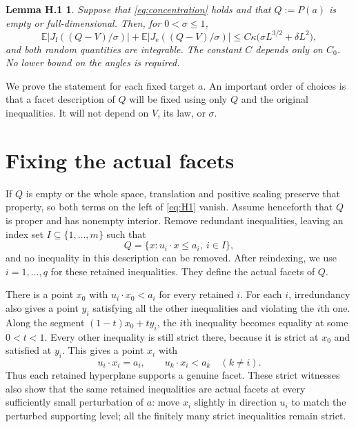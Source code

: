 \documentclass[11pt]{article}
\newcommand{\E}{\mathbb E}
\newcommand{\Jf}{J_{\mathrm f}}
\newcommand{\Je}{J_{\mathrm e}}
\newtheorem*{Hone}{Lemma H.1}
\begin{document}
\begin{Hone}
Suppose that \eqref{eq:concentration} holds and that $Q:=P(a)$ is empty
or full-dimensional. Then, for $0<\sigma\le1$,
\begin{equation}\label{eq:H1}
 \E\bigl|\Jf((Q-V)/\sigma)\bigr|
 +\E\bigl|\Je((Q-V)/\sigma)\bigr|
 \le C\kappa\bigl(\sigma L^{3/2}+\delta L^2\bigr),
\end{equation}
and both random quantities are integrable. The constant $C$ depends
only on $C_0$. No lower bound on the angles is required.
\end{Hone}

We prove the statement for each fixed target $a$. An important order
of choices is that a facet description of $Q$ will be fixed using only
$Q$ and the original inequalities. It will not depend on $V$, its
law, or $\sigma$.

\section{Fixing the actual facets}

If $Q$ is empty or the whole space, translation and positive scaling
preserve that property, so both terms on the left of \eqref{eq:H1}
vanish. Assume henceforth that $Q$ is proper and has nonempty interior.
Remove redundant inequalities, leaving
an index set $I\subseteq\{1,\ldots,m\}$ such that
\begin{equation}\label{eq:subsystem}
 Q=\{x:u_i\cdot x\le a_i,\ i\in I\},
\end{equation}
and no inequality in this description can be removed. After
reindexing, we use $i=1,\ldots,q$ for these retained inequalities.
They define the actual facets of $Q$.

There is a point $x_0$ with $u_i\cdot x_0<a_i$ for every retained $i$.
For each $i$, irredundancy also gives a point $y_i$ satisfying all the
other inequalities and violating the $i$th one. Along the segment
$(1-t)x_0+ty_i$, the $i$th inequality becomes equality at some
$0<t<1$. Every other inequality is still strict there, because it is
strict at $x_0$ and satisfied at $y_i$. This gives a point $x_i$ with
\begin{equation}\label{eq:facet-witness}
 u_i\cdot x_i=a_i,
 \qquad u_k\cdot x_i<a_k\quad(k\ne i).
\end{equation}
Thus each retained hyperplane supports a genuine facet. These strict
witnesses also show that the same retained inequalities are actual
facets at every sufficiently small perturbation of $a$: move $x_i$
slightly in direction $u_i$ to match the perturbed supporting level;
all the finitely many strict inequalities remain strict.
\end{document}

